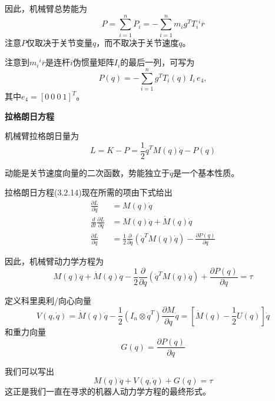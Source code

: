 \documentclass[12pt,a4paper]{ctexart}
\begin{document}
因此，机械臂总势能为
\begin{equation}
P = \sum_{i=1}^{n}P_i = -\sum_{i=1}^{n}m_i g^T T_i {^i\overline{r}}
\end{equation}
注意$P$仅取决于关节变量$q$，而不取决于关节速度$\dot{q}$。

注意到$m_i{^i\overline{r}}$是连杆$i$伪惯量矩阵$I_i$的最后一列，可写为
\begin{equation}\label{eq:3.2.36}
P(q) = -\sum_{i=1}^{n} g^T T_i(q)\, I_i\, e_4,
\end{equation}
其中$e_4 = [0\ 0\ 0\ 1]^T$。

\textbf{拉格朗日方程}

机械臂拉格朗日量为
\begin{equation}
L = K - P = \frac{1}{2}\dot{q}^T M(q)\dot{q} - P(q)
\end{equation}

动能是关节速度向量的二次函数，势能独立于$\dot{q}$是一个基本性质。

拉格朗日方程(3.2.14)现在所需的项由下式给出
\begin{align}
\frac{\partial L}{\partial \dot{q}} &= M(q)\dot{q} \\
\frac{d}{dt}\frac{\partial L}{\partial \dot{q}} &= M(q)\ddot{q} + \dot{M}(q)\dot{q} \\
\frac{\partial L}{\partial q} &= \frac{1}{2}\frac{\partial}{\partial q}(\dot{q}^T M(q)\dot{q}) - \frac{\partial P(q)}{\partial q}
\end{align}

因此，机械臂动力学方程为
\begin{equation}
M(q)\ddot{q} + \dot{M}(q)\dot{q} - \frac{1}{2}\frac{\partial}{\partial q}(\dot{q}^T M(q)\dot{q}) + \frac{\partial P(q)}{\partial q} = \tau
\end{equation}

定义科里奥利/向心向量
\begin{equation}
V(q,\dot{q}) = \dot{M}(q)\dot{q} - \frac{1}{2}(I_n \otimes \dot{q}^T)\frac{\partial M}{\partial q}\dot{q} = \left[\dot{M}(q) - \frac{1}{2}U(q)\right]\dot{q}
\end{equation}
和重力向量
\begin{equation}
G(q) = \frac{\partial P(q)}{\partial q}
\end{equation}

我们可以写出
\begin{equation}
M(q)\ddot{q} + V(q,\dot{q}) + G(q) = \tau
\end{equation}
这正是我们一直在寻求的机器人动力学方程的最终形式。
\end{document}
